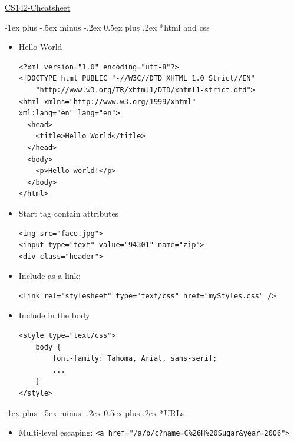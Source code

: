\documentclass[10pt,landscape]{article}
\makeatletter
\renewcommand{\section}{\@startsection{section}{1}{0mm}%
                                {-1ex plus -.5ex minus -.2ex}%
                                {0.5ex plus .2ex}%
                                {\normalfont\large\bfseries}}
\makeatother
\begin{document}
\raggedright
\footnotesize
\begin{multicols}{2}


\setlength{\premulticols}{1pt}
\setlength{\postmulticols}{1pt}
\setlength{\multicolsep}{1pt}
\setlength{\columnsep}{2pt}

\begin{center}
     \Large{\underline{CS142-Cheatsheet}} \\
\end{center}

\section*{html and css}
\begin{itemize}
\item Hello World
\begin{verbatim}
<?xml version="1.0" encoding="utf-8"?>
<!DOCTYPE html PUBLIC "-//W3C//DTD XHTML 1.0 Strict//EN"
    "http://www.w3.org/TR/xhtml1/DTD/xhtml1-strict.dtd">
<html xmlns="http://www.w3.org/1999/xhtml" 
xml:lang="en" lang="en">
  <head>
    <title>Hello World</title>
  </head>
  <body>
    <p>Hello world!</p>
  </body>
</html>
\end{verbatim}
\item Start tag contain attributes 
\begin{verbatim}
<img src="face.jpg">
<input type="text" value="94301" name="zip">
<div class="header">
\end{verbatim}
\item Include as a link:
\begin{verbatim}
<link rel="stylesheet" type="text/css" href="myStyles.css" />
\end{verbatim}
\item Include in the body
\begin{verbatim}
<style type="text/css">
    body {
        font-family: Tahoma, Arial, sans-serif;
        ...
    }
</style>
\end{verbatim}
\end{itemize}
\section*{URLs}
\begin{itemize}
\item Multi-level escaping: \verb|<a href="/a/b/c?name=C%26H%20Sugar&year=2006">|


\end{itemize}
\end{multicols}
\end{document}
